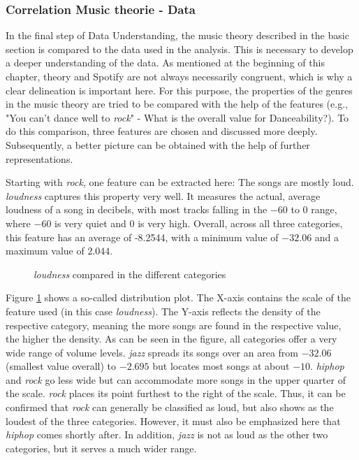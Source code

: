 \subsubsection{Correlation Music theorie - Data}
In the final step of Data Understanding,
the music theory described in the basic section is compared to the data used in the analysis.
This is necessary to develop a deeper understanding of the data.
As mentioned at the beginning of this chapter, theory and Spotify are not always necessarily congruent,
which is why a clear delineation is important here.
For this purpose, the properties of the genres in the music theory are tried to be compared
with the help of the features (e.g., "You can't dance well to \emph{rock}" - What is the overall value for Danceability?).
To do this comparison, three features are chosen and discussed more deeply.
Subsequently, a better picture can be obtained with the help of further representations.

Starting with \emph{\emph{rock}}, one feature can be extracted here: The songs are mostly loud.
\emph{loudness} captures this property very well.
It measures the actual, average loudness of a song in decibels, with most tracks falling
in the \(-60\) to \(0\) range, where \(-60\) is very quiet and \(0\) is very high.
Overall, across all three categories, this feature has an average of -8.2544,
with a minimum value of \(-32.06\) and a maximum value of \(2.044\).

\begin{figure}[H]
    \centering
    \qquad
    \caption{\emph{loudness} compared in the different categories}%
    \label{fig:du_dp_bp_ln_categorie_dependent}%
\end{figure}

Figure \ref{fig:du_dp_bp_ln_categorie_dependent} shows a so-called distribution plot.
The X-axis contains the scale of the feature used (in this case \emph{loudness}).
The Y-axis reflects the density of the respective category, meaning the more songs are found in the respective value, the higher the density.
As can be seen in the figure, all categories offer a very wide range of volume levels.
\emph{jazz} spreads its songs over an area from \(-32.06\) (smallest value overall) to \(-2.695\) but locates
most songs at about \(-10\). \emph{\emph{hiphop}} and \emph{rock} go less wide but can accommodate more songs in the upper
quarter of the scale. \emph{rock} places its point furthest to the right of the scale.
Thus, it can be confirmed that \emph{rock} can generally be classified as loud,
but also shows as the loudest of the three categories.
However, it must also be emphasized here that \emph{\emph{hiphop}} comes shortly after.
In addition, \emph{jazz} is not as loud as the other two categories, but it serves a much wider range. 

